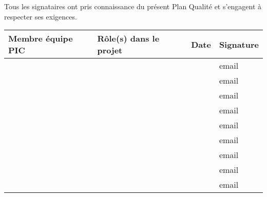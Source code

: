 Tous les signataires ont pris connaissance du présent Plan Qualité et s'engagent à respecter ses exigences. \\
	
	\vspace{1cm}

\begin{tabular}[h]{|p{}|p{}|p{}|p{}|}
	\hline
	
	\cellcolor{gray!40}Membre équipe PIC & \cellcolor{gray!40}Rôle(s) dans le projet & \cellcolor{gray!40}Date & \cellcolor{gray!40}Signature \\\hline
	\Sergi 		& \CP 				&  & email \\\hline
	\Pierre 		& \RQ \newline \CPA 	&  & email \\\hline
	\Michel 		& \D \newline \RD 	&  & email \\\hline
	\Kafui 		& \D \newline \RQA 	&  & email \\\hline
	\Matthieu 	& \D \newline \RRS 	&  & email \\\hline
	\Mathieu 	& \D \newline \RGC 	&  & email \\\hline
	\Florian 	& \D \newline \RS	&  & email \\\hline
	\Melissa 	& \D 				&  & email \\\hline
	\Julie		& \D 				&  & email \\\hline
\end{tabular}
